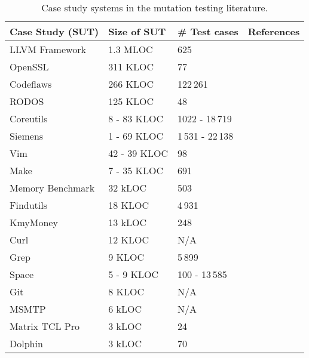 



\begin{table}[h]
\tiny 
\caption{Case study systems in the mutation testing literature.}
\label{table:benchmarks} 
\begin{tabular}{p{2cm}p{2cm}p{1cm}p{3cm}}
\hline
\textbf{Case Study (SUT)}	&	\textbf{Size of SUT}	&	\textbf{\# Test cases}&	\textbf{References}	\\
\hline
LLVM Framework & 1.3 MLOC & 625 & \cite{denisov2018mull}\\
OpenSSL & 311 KLOC & 77 & \cite{denisov2018mull}\\
Codeflaws & 266 KLOC & 122\,261 & \cite{papadakis2018mutant}\\
RODOS & 125 KLOC & 48 & \cite{denisov2018mull}\\
Coreutils & 8 - 83 KLOC & 1022 - 18\,719 & \cite{hariri2019comparing,papadakis2018mutation,chekam2017empirical}\\
Siemens & 1 - 69 KLOC & 1\,531 - 22\,138 & \cite{phan2018music,wang2017faster,papadakis2016threats,papadakis2014mitigating,yao2014study,clark2013semantic}\\
Vim & 42 - 39 KLOC & 98 & \cite{wang2017faster,kintis2017detecting,papadakis2015trivial}\\
Make & 7 - 35 KLOC & 691 & \cite{papadakis2018mutation,chekam2017empirical,kintis2017detecting,papadakis2015trivial,yao2014study}\\
Memory Benchmark & 32 kLOC & 503 & \cite{wu2017memory}\\
Findutils & 18 KLOC & 4\,931 &  \cite{papadakis2018mutation,chekam2017empirical}\\
KmyMoney & 13 kLOC & 248 & \cite{delgado2017assessment}\\
Curl & 12 KLOC & N/A & \cite{phan2018music}\\
Grep & 9 KLOC & 5\,899 & \cite{papadakis2018mutation,chekam2017empirical}\\
Space & 5 - 9 KLOC & 100 - 13\,585 & \cite{tokumoto2016muvm,papadakis2014mitigating,yao2014study,clark2013semantic}\\
Git & 8 KLOC & N/A & \cite{kintis2017detecting,papadakis2015trivial}\\
MSMTP & 6 kLOC & N/A & \cite{kintis2017detecting,papadakis2015trivial}\\
Matrix TCL Pro & 3 kLOC & 24 & \cite{delgado2017assessment}\\
Dolphin & 3 kLOC & 70 &  \cite{delgado2017assessment}\\

\end{tabular}
\end{table}
